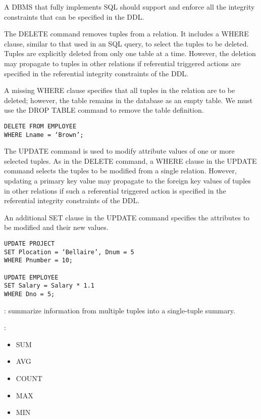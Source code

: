     \par A DBMS that fully implements SQL should support and enforce all the integrity
constraints that can be specified in the DDL.

    \par The DELETE command removes tuples from a relation. It includes a WHERE clause, similar to that used in an SQL query, to select the tuples to be deleted. Tuples are explicitly deleted from only one table at a time. However, the deletion may propagate to tuples in other relations if referential triggered actions are specified in the referential integrity constraints of the DDL.
    \par A missing WHERE clause specifies that all tuples in the relation are to be deleted; however, the table remains in the database as an empty table. We must use the DROP TABLE command to remove the table definition.
    \begin{verbatim}
DELETE FROM EMPLOYEE
WHERE Lname = ‘Brown’;
    \end{verbatim}

    \par The UPDATE command is used to modify attribute values of one or more selected tuples. As in the DELETE command, a WHERE clause in the UPDATE command selects the tuples to be modified from a single relation. However, updating a primary key value may propagate to the foreign key values of tuples in other relations if such a referential triggered action is specified in the referential integrity constraints of the DDL.
    \par An additional SET clause in the UPDATE command specifies the attributes to be modified and their new values.
    \begin{verbatim}
UPDATE PROJECT
SET Plocation = ‘Bellaire’, Dnum = 5
WHERE Pnumber = 10;

UPDATE EMPLOYEE
SET Salary = Salary * 1.1
WHERE Dno = 5;
    \end{verbatim}

  \par {}: summarize information from multiple tuples into a single-tuple summary.

  \par {}:
    \begin{itemize}
      \item SUM
      \item AVG
      \item COUNT
      \item MAX
      \item MIN
    \end{itemize}

